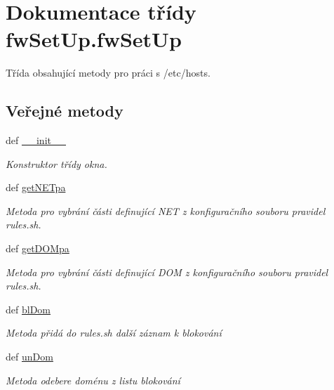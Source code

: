 \hypertarget{classfwSetUp_1_1fwSetUp}{\section{Dokumentace třídy fw\-Set\-Up.\-fw\-Set\-Up}
\label{dd/dd2/classfwSetUp_1_1fwSetUp}
}


Třída obsahující metody pro práci s /etc/hosts.  


\subsection*{Veřejné metody}
\begin{DoxyCompactItemize}
\item 
def \hyperlink{classfwSetUp_1_1fwSetUp_ad05f56aa9dd4503852ec2bcfb2a3afe2}{\-\_\-\-\_\-init\-\_\-\-\_\-}
\begin{DoxyCompactList}\small\item\em Konstruktor třídy okna. \end{DoxyCompactList}\item 
def \hyperlink{classfwSetUp_1_1fwSetUp_a280e0fbdf7efa6835fee31650a79e02b}{get\-N\-E\-Tpa}
\begin{DoxyCompactList}\small\item\em Metoda pro vybrání části definující N\-E\-T z konfiguračního souboru pravidel rules.\-sh. \end{DoxyCompactList}\item 
def \hyperlink{classfwSetUp_1_1fwSetUp_a29cba8b25408c6c37632e9e969343f3b}{get\-D\-O\-Mpa}
\begin{DoxyCompactList}\small\item\em Metoda pro vybrání části definující D\-O\-M z konfiguračního souboru pravidel rules.\-sh. \end{DoxyCompactList}\item 
def \hyperlink{classfwSetUp_1_1fwSetUp_aea3760656409015f15b9b3450edd70e1}{bl\-Dom}
\begin{DoxyCompactList}\small\item\em Metoda přidá do rules.\-sh další záznam k blokování \end{DoxyCompactList}\item 
def \hyperlink{classfwSetUp_1_1fwSetUp_a3a03c76b94db3bc750260ab64d76d755}{un\-Dom}
\begin{DoxyCompactList}\small\item\em Metoda odebere doménu z listu blokování \end{DoxyCompactList}\item 

\end{DoxyCompactItemize}
